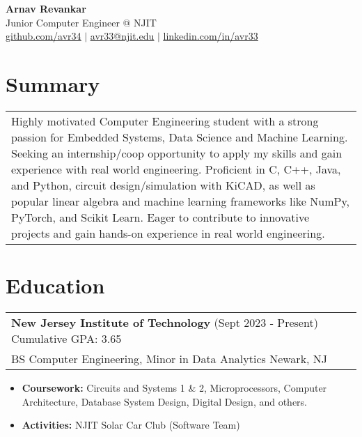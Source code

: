 \documentclass{article}
\newcommand{\underlinedLink}[2]{
    {\underline{\large \href{#1}{#2}}}
}
\begin{document}
\begin{spacing}{1.4}
    \begin{center}
        {\bf\Huge Arnav Revankar} \\
        {\large Junior Computer Engineer @ NJIT} \\
        \underlinedLink{https://github.com/BumpyTurtle127}{github.com/avr34} $|$ \underlinedLink{mailto:avr33@njit.edu}{avr33@njit.edu} $|$ \underlinedLink{https://linkedin.com/in/avr33}{linkedin.com/in/avr33}
    \end{center}
\end{spacing}
\vspace{-9pt}

\section{Summary}
    \begin{center}
        \begin{tabular}{p{}}
            Highly motivated Computer Engineering student with a strong passion for Embedded Systems, Data Science and Machine Learning. Seeking an internship/coop opportunity to apply my skills and gain experience with real world engineering. Proficient in C, C++, Java, and Python, circuit design/simulation with KiCAD, as well as popular linear algebra and machine learning frameworks like NumPy, PyTorch, and Scikit Learn. Eager to contribute to innovative projects and gain hands-on experience in real world engineering. \\
        \end{tabular}
    \end{center}

\section{Education}
    \vspace{-5pt}\begin{center}
        \begin{tabular}{p{}}
            {\large \bf New Jersey Institute of Technology} (Sept 2023 - Present) \hfill Cumulative GPA: 3.65 \\
            BS Computer Engineering, Minor in Data Analytics \hfill Newark, NJ
        \end{tabular}
    \end{center}
    \vspace{-10pt}\begin{itemize}
        \item {\bf Coursework:} Circuits and Systems 1 \& 2, Microprocessors, Computer Architecture, Database System Design, Digital Design, and others.
        \item {\bf Activities:} NJIT Solar Car Club (Software Team)
    \end{itemize}
\end{document}

